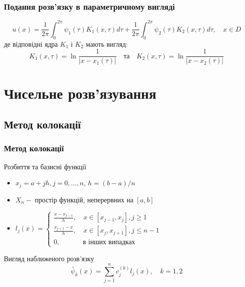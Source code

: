 \documentclass{beamer}
\numberwithin{equation}{section}
\begin{document}
	\begin{frame}
		\frametitle{Подання розв'язку в параметричному вигляді}
		$$
		u(x)=\frac{1}{2 \pi} \int_{0}^{2 \pi} \psi_{1}(\tau) K_{1}(x, \tau) d \tau+\frac{1}{2 \pi} \int_{0}^{2 \pi} \psi_{2}(\tau) K_{2}(x, \tau) d \tau, \quad x \in D
		$$
		де відповідні ядра $K_{1}$ і $K_{2}$ мають вигляд:
		$$
		K_{1}(x, \tau)=\ln \frac{1}{\left|x-x_{1}(\tau)\right|}
		\quad \text{та} \quad 
		K_{2}(x, \tau)=\ln \frac{1}{\left|x-x_{2}(\tau)\right|}
		$$
		
		
	\end{frame}

	\section{Чисельне розв'язування} 

	\subsection{Метод колокації}
	\begin{frame}
		\frametitle{Метод колокації}
		
		\begin{block}{Розбиття та базисні функції}
			\begin{itemize}
			\item $x_{j}=a+j h, j=0, \ldots, n$, $h=(b-a) / n$
			\vspace{0.3cm}
			\item $X_{n}-$ простір функцій, неперервних на $[a, b]$
			\item $l_{j}(x)=\left\{
			\begin{array}{lc}
				\frac{x-x_{j-1}}{h}, \quad x \in\left[x_{j-1}, x_{j}\right], j \geq 1 \\
				\frac{x_{j+1}-x}{h}, \quad x \in\left[x_{j}, x_{j+1}\right], j \leq n-1 \\
				0, \qquad\quad \text { в інших випадках }
			\end{array}\right.$
		
			\end{itemize}
		\end{block}
		
		\begin{block}{Вигляд наближеного розв'язку}
		$$
		\tilde{\psi_k}(x)=\sum_{j=1}^{n} c^{(k)}_{j} l_{j}(x), \quad k = 1, 2
		$$
		\end{block}
		

	\end{frame}
\end{document}
